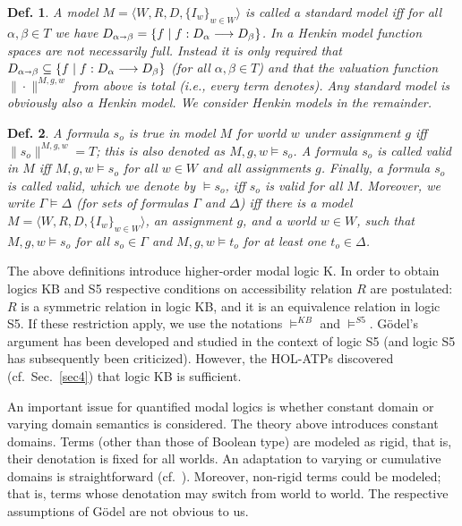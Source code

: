 \documentclass{ecai2014}
\newtheorem{definition}{Def.}
\def\ar{\shortrightarrow}
\begin{document}
\begin{definition}\label{homlhenkinmodel}
 A model $M=\langle W, R, D, \{I_w\}_{w\in W}\rangle$ is called a
 \emph{standard model} iff for all $\alpha,\beta\in T$ we have
 $D_{\alpha\ar\beta} = \{ f \mid f : D_\alpha \longrightarrow D_\beta
 \}$. In a \emph{Henkin model} function spaces are not necessarily
 full. Instead it is only required that $D_{\alpha\ar\beta}
 \subseteq \{ f \mid f : D_\alpha \longrightarrow D_\beta \}$ (for all
 $\alpha,\beta\in T$) and that the valuation function 
 $\|\cdot\|^{M,g,w}$ from above is total (i.e., every term denotes). Any standard model is obviously
 also a Henkin model. We consider Henkin models in the remainder.
\end{definition}

\begin{definition}\label{homlvalid}
A formula $s_o$ is \emph{true} in model $M$ for world $w$
under assignment $g$ iff $\|s_o\|^{M,g,w} = T$; this is also denoted
as $M,g,w \models s_o$.  A formula $s_o$ is called \emph{valid} in
$M$ iff $M,g,w \models s_o$ for all $w\in W$ and all
assignments $g$. Finally, a formula $s_o$ is called
\emph{valid}, which we denote by $\models s_o$, iff $s_o$ is valid for
all $M$. Moreover, we write $\Gamma\models \Delta$ (for sets of
 formulas $\Gamma$ and $\Delta$) iff there is a model $M=\langle W, R, D, \{I_w\}_{w\in W}
\rangle$, an assignment $g$, and a world $w\in W$, such that  
 $M,g,w \models s_o$ for all $s_o\in \Gamma$ and $M,g,w \models t_o$ for at least one $t_o\in \Delta$.
\end{definition}

The above definitions introduce higher-order modal logic K. In order
to obtain logics KB and S5 respective conditions on accessibility
relation $R$ are postulated: $R$ is a symmetric relation in logic KB,
and it is an equivalence relation in logic S5. If these restriction apply,
we use the notations $\models^{KB}$ and $\models^{S5}$.  G{\"o}del's
argument has been developed and studied in the context of logic
S5 (and logic S5 has subsequently been criticized). However, the
HOL-ATPs discovered (cf.~Sec.~\ref{sec4}) that logic KB
is sufficient.

An important issue for quantified modal logics is whether constant
domain or varying domain semantics is considered. The theory above
introduces constant domains. 
Terms (other than those of Boolean type) are modeled as rigid, that
is, their denotation is fixed for all worlds. 
%
An adaptation to varying or cumulative
domains is straightforward (cf.~\cite{fitting98}). Moreover, non-rigid
terms could be modeled; that is, terms whose denotation may switch
from world to world. 
%
The respective assumptions of 
G\"odel are not obvious to us.
\end{document}
